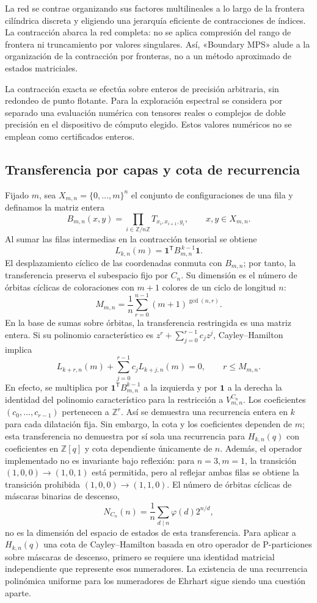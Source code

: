 \documentclass[11pt,a4paper]{article}
\theoremstyle{definition}
\begin{document}
La red se contrae organizando sus factores multilineales a lo largo de la
frontera cilíndrica discreta y eligiendo una jerarquía eficiente de
contracciones de índices. La contracción abarca la red completa: no se
aplica compresión del rango de frontera ni truncamiento por valores
singulares. Así, «Boundary MPS» alude a la organización de la contracción
por fronteras, no a un método aproximado de estados matriciales.

La contracción exacta se efectúa sobre enteros de precisión arbitraria,
sin redondeo de punto flotante. Para la exploración espectral se considera
por separado una evaluación numérica con tensores reales o complejos de
doble precisión en el dispositivo de cómputo elegido. Estos valores
numéricos no se emplean como certificados enteros.

\subsection{Transferencia por capas y cota de recurrencia}

Fijado $m$, sea $X_{m,n}=\{0,\ldots,m\}^n$ el conjunto de configuraciones
de una fila y definamos la matriz entera
\[
B_{m,n}(x,y)=\prod_{i\in\mathbb Z/n\mathbb Z}
T_{x_i,x_{i+1},y_i},
\qquad x,y\in X_{m,n}.
\]
Al sumar las filas intermedias en la contracción tensorial se obtiene
\[
L_{k,n}(m)=\mathbf 1^{\mathsf T}B_{m,n}^{\,k-1}\mathbf 1.
\]
El desplazamiento cíclico de las coordenadas conmuta con $B_{m,n}$;
por tanto, la transferencia preserva el subespacio fijo por $C_n$. Su
dimensión es el número de órbitas cíclicas de coloraciones con $m+1$
colores de un ciclo de longitud $n$:
\[
M_{m,n}=\frac1n\sum_{r=0}^{n-1}(m+1)^{\gcd(n,r)}.
\]
En la base de sumas sobre órbitas, la transferencia restringida es una
matriz entera. Si su polinomio característico es
$z^r+\sum_{j=0}^{r-1}c_jz^j$, Cayley--Hamilton implica
\[
L_{k+r,n}(m)+\sum_{j=0}^{r-1}c_jL_{k+j,n}(m)=0,
\qquad r\le M_{m,n}.
\]
En efecto, se multiplica por $\mathbf 1^{\mathsf T}B_{m,n}^{k-1}$ a la
izquierda y por $\mathbf 1$ a la derecha la identidad del polinomio
característico para la restricción a $V_{m,n}^{C_n}$. Los coeficientes
$(c_0,\ldots,c_{r-1})$ pertenecen a $\mathbb Z^r$.
Así se demuestra una recurrencia entera en $k$ para cada dilatación fija.
Sin embargo, la cota y los coeficientes dependen de $m$; esta transferencia
no demuestra por sí sola una recurrencia para $H_{k,n}(q)$ con
coeficientes en $\mathbb Z[q]$ y cota dependiente únicamente de $n$.
Además, el operador implementado no es invariante bajo reflexión: para
$n=3,m=1$, la transición $(1,0,0)\to(1,0,1)$ está permitida, pero al
reflejar ambas filas se obtiene la transición prohibida
$(1,0,0)\to(1,1,0)$. El número de órbitas cíclicas de máscaras binarias
de descenso,
\[
N_{C_n}(n)=\frac1n\sum_{d\mid n}\varphi(d)2^{n/d},
\]
no es la dimensión del espacio de estados de esta transferencia. Para
aplicar a $H_{k,n}(q)$ una cota de Cayley--Hamilton basada en otro
operador de P-particiones sobre máscaras de descenso, primero se requiere
una identidad matricial independiente que represente esos numeradores.
La existencia de una recurrencia polinómica uniforme para los numeradores
de Ehrhart sigue siendo una cuestión aparte.
\end{document}
